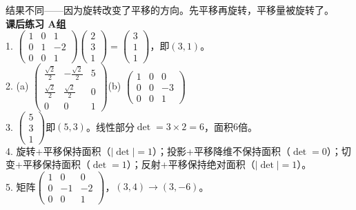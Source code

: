 结果不同——因为旋转改变了平移的方向。先平移再旋转，平移量被旋转了。\\

\noindent\textbf{课后练习 A组}\\
1. $\begin{pmatrix}1&0&1\\0&1&-2\\0&0&1\end{pmatrix}\begin{pmatrix}2\\3\\1\end{pmatrix}=\begin{pmatrix}3\\1\\1\end{pmatrix}$，即$(3,1)$。\\
2. (a) $\begin{pmatrix}\frac{\sqrt2}{2}&-\frac{\sqrt2}{2}&5\\\frac{\sqrt2}{2}&\frac{\sqrt2}{2}&0\\0&0&1\end{pmatrix}$\quad (b) $\begin{pmatrix}1&0&0\\0&0&-3\\0&0&1\end{pmatrix}$\\
3. $\begin{pmatrix}5\\3\\1\end{pmatrix}$即$(5,3)$。线性部分$\det=3\times2=6$，面积$6$倍。\\
4. 旋转+平移保持面积（$|\det|=1$）；投影+平移降维不保持面积（$\det=0$）；切变+平移保持面积（$\det=1$）；反射+平移保持绝对面积（$|\det|=1$）。\\
5. 矩阵$\begin{pmatrix}1&0&0\\0&-1&-2\\0&0&1\end{pmatrix}$，$(3,4)\to(3,-6)$。\\

